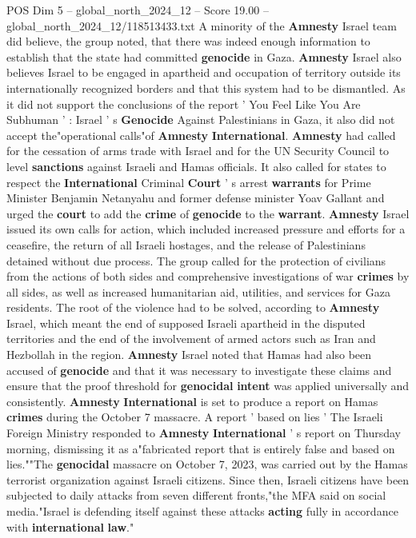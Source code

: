 \begin{textsample}{POS Dim 5 – global\_north\_2024\_12 – Score 19.00 – global\_north\_2024\_12/118513433.txt}
A minority of the \textbf{Amnesty} Israel team did believe, the group noted, that there was indeed enough information to establish that the state had committed \textbf{genocide} in Gaza. \textbf{Amnesty} Israel also believes Israel to be engaged in apartheid and occupation of territory outside its internationally recognized borders and that this system had to be dismantled.
As it did not support the conclusions of the report ' You Feel Like You Are Subhuman ' : Israel ' s \textbf{Genocide} Against Palestinians in Gaza, it also did not accept the"operational calls"of \textbf{Amnesty} \textbf{International}. \textbf{Amnesty} had called for the cessation of arms trade with Israel and for the UN Security Council to level \textbf{sanctions} against Israeli and Hamas officials.
It also called for states to respect the \textbf{International} Criminal \textbf{Court} ' s arrest \textbf{warrants} for Prime Minister Benjamin Netanyahu and former defense minister Yoav Gallant and urged the \textbf{court} to add the \textbf{crime} of \textbf{genocide} to the \textbf{warrant}. \textbf{Amnesty} Israel issued its own calls for action, which included increased pressure and efforts for a ceasefire, the return of all Israeli hostages, and the release of Palestinians detained without due process.
The group called for the protection of civilians from the actions of both sides and comprehensive investigations of war \textbf{crimes} by all sides, as well as increased humanitarian aid, utilities, and services for Gaza residents.
The root of the violence had to be solved, according to \textbf{Amnesty} Israel, which meant the end of supposed Israeli apartheid in the disputed territories and the end of the involvement of armed actors such as Iran and Hezbollah in the region. \textbf{Amnesty} Israel noted that Hamas had also been accused of \textbf{genocide} and that it was necessary to investigate these claims and ensure that the proof threshold for \textbf{genocidal} \textbf{intent} was applied universally and consistently. \textbf{Amnesty} \textbf{International} is set to produce a report on Hamas \textbf{crimes} during the October 7 massacre.
A report ' based on lies ' The Israeli Foreign Ministry responded to \textbf{Amnesty} \textbf{International} ' s report on Thursday morning, dismissing it as a"fabricated report that is entirely false and based on lies.""The \textbf{genocidal} massacre on October 7, 2023, was carried out by the Hamas terrorist organization against Israeli citizens.
Since then, Israeli citizens have been subjected to daily attacks from seven different fronts,"the MFA said on social media."Israel is defending itself against these attacks \textbf{acting} fully in accordance with \textbf{international} \textbf{law}."

\end{textsample}
